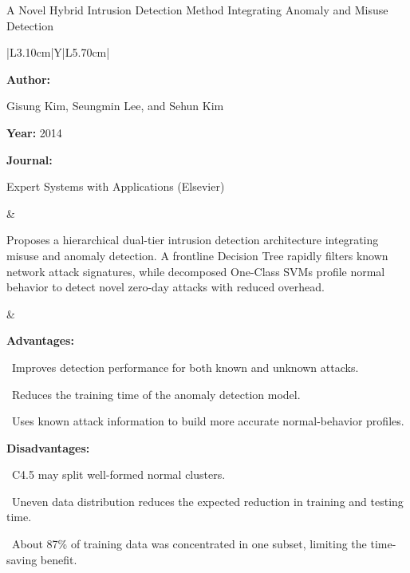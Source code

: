 \begin{frame}[t]{A Novel Hybrid Intrusion Detection Method Integrating Anomaly and Misuse Detection}
\vspace{-0.30em}
{\footnotesize\setlength{\tabcolsep}{3.5pt}\renewcommand{\arraystretch}{1.10}
\begin{tabularx}{\textwidth}{|L{3.10cm}|Y|L{5.70cm}|}
\hline\lrhdr\hline
\begin{minipage}[t]{\linewidth}\fontsize{7.2pt}{9.2pt}\raggedright\selectfont
\textbf{Author:}\par
Gisung Kim, Seungmin Lee, and Sehun Kim\par\vspace{4pt}
\textbf{Year:} 2014\par\vspace{4pt}
\textbf{Journal:}\par
Expert Systems with Applications (Elsevier)\par\vspace{4pt}
\end{minipage}
&
\begin{minipage}[t]{\linewidth}\fontsize{7.2pt}{9.2pt}\raggedright\selectfont
Proposes a hierarchical dual-tier intrusion detection architecture integrating misuse and anomaly detection. A frontline Decision Tree rapidly filters known network attack signatures, while decomposed One-Class SVMs profile normal behavior to detect novel zero-day attacks with reduced overhead.\par\vspace{4pt}
\end{minipage}
&
\begin{minipage}[t]{\linewidth}\fontsize{6.8pt}{8.4pt}\raggedright\selectfont
\textcolor{strengthGreen}{\textbf{Advantages:}}\par\vspace{1.3pt}
\textbullet~Improves detection performance for both known and unknown attacks.\par\vspace{1.8pt}\textbullet~Reduces the training time of the anomaly detection model.\par\vspace{1.8pt}\textbullet~Uses known attack information to build more accurate normal-behavior profiles.\par\vspace{3.2pt}
\textcolor{limitRed}{\textbf{Disadvantages:}}\par\vspace{1.3pt}
\textbullet~C4.5 may split well-formed normal clusters.\par\vspace{1.8pt}\textbullet~Uneven data distribution reduces the expected reduction in training and testing time.\par\vspace{1.8pt}\textbullet~About 87\% of training data was concentrated in one subset, limiting the time-saving benefit.\par\vspace{3pt}
\end{minipage} \\\hline
\end{tabularx}}
\end{frame}

